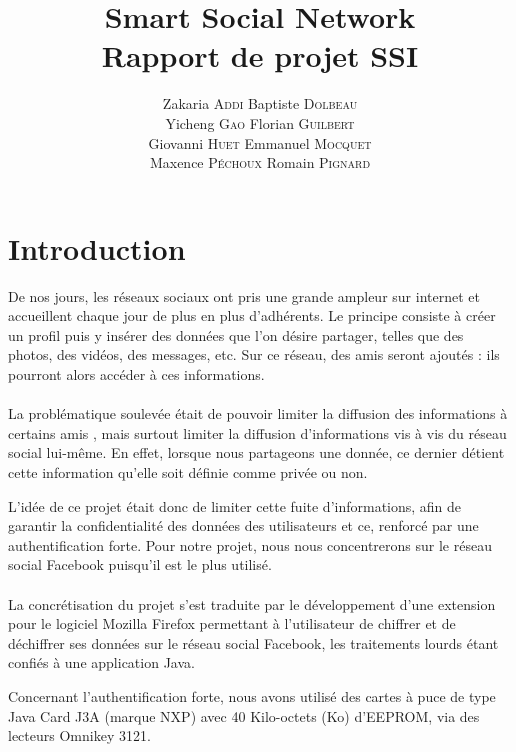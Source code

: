 \documentclass[a4paper,11pt,french]{article}
\title{Smart Social Network\\Rapport de projet SSI }
\author{
    Zakaria \textsc{Addi}
    Baptiste \textsc{Dolbeau}\\
    Yicheng \textsc{Gao}
    Florian \textsc{Guilbert}\\
    Giovanni \textsc{Huet}
    Emmanuel \textsc{Mocquet}\\
    Maxence \textsc{Péchoux}
    Romain \textsc{Pignard}
}
\begin{document}
\maketitle

\tableofcontents

\section{Introduction}
\renewcommand\labelitemi{\textbullet} %
\renewcommand\labelitemii{$\circ$} %
De nos jours, les réseaux sociaux ont pris une grande ampleur sur internet
et accueillent chaque jour de plus en plus d'adhérents. Le principe consiste
à créer un profil puis y insérer des données que l'on désire partager, telles
que des photos, des vidéos, des messages, etc. Sur ce réseau, des \og{}
amis \fg{} seront ajoutés : ils pourront alors accéder à ces informations.

\paragraph{}
La problématique soulevée était de pouvoir limiter la diffusion des informations
à certains \og amis \fg{}, mais surtout limiter la diffusion d'informations
vis à vis du réseau social lui-même. En effet, lorsque nous partageons une
donnée, ce dernier détient cette information qu'elle soit définie comme privée
ou non.

L'idée de ce projet était donc de limiter cette fuite d'informations, afin de 
garantir la confidentialité des données des utilisateurs et ce, renforcé par une
authentification forte. Pour notre projet, nous nous concentrerons sur le réseau
social Facebook puisqu'il est le plus utilisé.


\paragraph{}
La concrétisation du projet s'est traduite par le développement d'une extension 
pour le logiciel Mozilla Firefox permettant à l’utilisateur de chiffrer et de
déchiffrer ses données sur le réseau social Facebook, les traitements lourds
étant confiés à une application Java.

Concernant l’authentification forte, nous avons utilisé des cartes à puce de 
type Java Card J3A (marque NXP) avec 40 Kilo-octets (Ko) d'EEPROM, via des 
lecteurs Omnikey 3121. 
\end{document}
